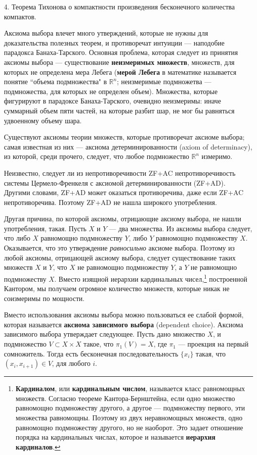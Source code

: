 \documentclass[12pt]{book}
\def\R{{\mathbb R}}
\theoremstyle{upshape}
\theoremstyle{generic}
\def\еза{\end{remark}}
\theoremstyle{upshapenonumber}
\newcommand{\следствие}{%
     \refstepcounter{teorema}
     {\noindent\bf Следствие \thechapter.\arabic{teorema}:\ }}
\newcommand{\пример}{%
     \refstepcounter{teorema}
     {\noindent\bf Пример \thechapter.\arabic{teorema}:\ }}
\newcommand{\лемма}{%
     \refstepcounter{teorema}
     {\noindent\bf Лемма \thechapter.\arabic{teorema}:\ }}
\newcommand{\теорема}{%
     \refstepcounter{teorema}
     {\noindent\bf Теорема \thechapter.\arabic{teorema}:\ }}
\newcommand{\утверждение}{%
     \refstepcounter{teorema}
     {\noindent\bf Утверждение \thechapter.\arabic{teorema}:\ }}
\def\бф{\bf}
\def\ем{\em}
\def\ез{\end{zadacha}}
\def\еу{\end{ukazanie}}
\def\ео{\end{opredelenie}}
\def\енум{\begin{enumerate}}
\def\ее{\end{enumerate}}
\begin{document}
4. Теорема Тихонова о компактности произведения
бесконечного количества компактов.

Аксиома выбора влечет
много утверждений, которые не нужны для доказательства
полезных теорем, и противоречат
интуиции --- наподобие парадокса Банаха-Тарского.
Основная проблема, которая следует из 
принятия аксиомы выбора --- существование
{\бф неизмеримых множеств}, множеств, для
которых не определена мера Лебега ({\bf мерой
Лебега} в математике называется 
понятие ``объема подмножества" в $\R^n$;
неизмеримые подмножетва --- подмножества,
для которых не определен объем).
Множества, которые фигурируют в парадоксе
Банаха-Тарского, очевидно неизмеримы: иначе
суммарный объем пяти частей, на которые
разбит шар, не мог бы равняться удвоенному
объему шара.

Существуют аксиомы теории множеств, которые
противоречат аксиоме выбора; самая известная
из них --- аксиома детерминированности
(axiom of determinacy),
из которой, среди прочего, следует,
что любое подмножество $\R^n$ измеримо.

Неизвестно, следует ли из непротиворечивости
ZF+AC непротиворечивость системы Цермело-Френкеля
с аксиомой детерминированности (ZF+AD). Другими
словами, ZF+AD может оказаться противоречива,
даже если ZF+AC непротиворечива. Поэтому
ZF+AD не нашла широкого употребления.

Другая причина, по которой аксиомы, отрицающие
аксиому выбора, не нашли употребления, такая.
Пусть $X$ и $Y$ --- два множества. Из аксиомы выбора
следует, что либо $X$ равномощно подмножеству $Y$, либо
$Y$ равномощно подмножеству $X$. Оказывается,
что это утверждение {\ем равносильно} аксиоме выбора.
Поэтому из любой аксиомы, отрицающей аксиому
выбора, следует существование таких множеств
$X$ и $Y$, что $X$ не равномощно подмножеству
$Y$, а $Y$ не равномощно подмножеству $X$.
Вместо изящной иерархии кардинальных
чисел,\footnote{{\bf Кардиналом}, или 
{\bf кардинальным
числом}, называется класс равномощных
множеств. Согласно теореме Кантора-Бернштейна, 
если одно множество равномощно подмножеству
другого, а другое --- подмножеству первого,
эти множества равномощны. Поэтому из двух
неравномощных множеств, одно равномощно
подмножеству другого, но не наоборот.
Это задает отношение порядка на кардинальных
числах, которое и называется {\бф иерархия
кардиналов}.}
построенной Кантором, мы получаем огромное
количество множеств, которые никак не соизмеримы
по мощности. 

Вместо использования аксиомы выбора
можно пользоваться ее слабой формой,
которая называется {\бф аксиома зависимого выбора}
(de\-pen\-dent choice). Аксиома зависимого выбора
утверждает следующее. Пусть дано  множество $X$,
и подмножество $V\subset X \times X$
такое, что $\pi_1(V)=X$, где $\pi_1$ --- проекция
на первый сомножитель. Тогда есть бесконечная
последовательность $\{x_i\}$
такая, что $(x_i, x_{i+1})\in V$, для любого $i$.
\end{document}
